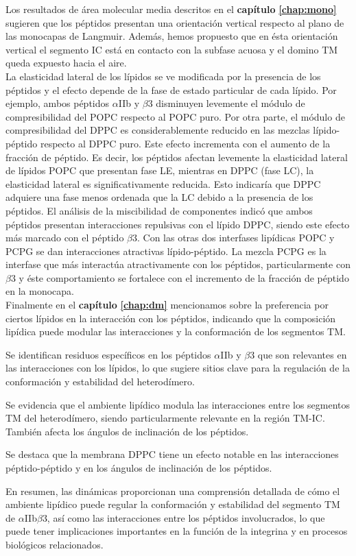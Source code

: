     Los resultados de área molecular media descritos en el \textbf{capítulo} \textbf{\ref{chap:mono}} sugieren que los péptidos presentan una orientación vertical respecto al plano de las monocapas de Langmuir. Además, hemos propuesto que en ésta orientación vertical el segmento IC está en contacto con la subfase acuosa y el domino TM queda expuesto hacia el aire.\\
  La elasticidad lateral de los lípidos se ve modificada por la presencia de los péptidos y el efecto depende de la fase de estado particular de cada lípido. Por ejemplo, ambos péptidos $\alpha$IIb y $\beta$3 disminuyen levemente el módulo de compresibilidad del POPC respecto al POPC puro. Por otra parte, el módulo de compresibilidad del DPPC es considerablemente reducido en las mezclas lípido-péptido respecto al DPPC puro. Este efecto incrementa con el aumento de la fracción de péptido. Es decir, los péptidos afectan levemente la elasticidad lateral de lípidos POPC que presentan fase LE, mientras en DPPC (fase LC), la elasticidad lateral es significativamente reducida. Esto indicaría que DPPC adquiere una fase menos ordenada que la LC debido a la presencia de los péptidos.
  El análisis de la miscibilidad de componentes indicó que ambos péptidos presentan interacciones repulsivas con el lípido DPPC, siendo este efecto más marcado con el péptido $\beta$3. Con las otras dos interfases lipídicas POPC y PCPG se dan interacciones atractivas lípido-péptido. La mezcla PCPG es la interfase que más interactúa atractivamente con los péptidos, particularmente con  $\beta$3 y éste comportamiento se fortalece con el incremento de la fracción de péptido en la monocapa.\\
  
  Finalmente en el \textbf{capítulo} \textbf{\ref{chap:dm}} mencionamos sobre la preferencia por ciertos lípidos en la interacción con los péptidos, indicando que la composición lipídica puede modular las interacciones y la conformación de los segmentos TM.
  
  Se identifican residuos específicos en los péptidos $\alpha$IIb y $\beta$3 que son relevantes en las interacciones con los lípidos, lo que sugiere sitios clave para la regulación de la conformación y estabilidad del heterodímero.
  
  Se evidencia que el ambiente lipídico modula las interacciones entre los segmentos TM del heterodímero, siendo particularmente relevante en la región TM-IC. También afecta los ángulos de inclinación de los péptidos. 
    
   Se destaca que la membrana DPPC tiene un efecto notable en las interacciones péptido-péptido y en los ángulos de inclinación de los péptidos.
    
    En resumen, las dinámicas proporcionan una comprensión detallada de cómo el ambiente lipídico puede regular la conformación y estabilidad del segmento TM de $\alpha$IIb$\beta$3, así como las interacciones entre los péptidos involucrados, lo que puede tener implicaciones importantes en la función de la integrina y en procesos biológicos relacionados.